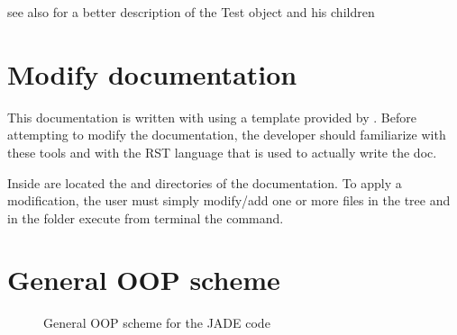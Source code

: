 \documentclass[letterpaper,10pt,english]{sphinxmanual}
\let\sphinxpxdimen\pdfpxdimen\else\newdimen\sphinxpxdimen
\begin{document}


see also {\hyperref[\detokenize{api/inputgeneration:testrunmodule}]{}} for a better description of the Test object and his children




\chapter{Modify documentation}
\label{\detokenize{dev/docmodify:modify-documentation}}\label{\detokenize{dev/docmodify::doc}}
This documentation is written with
 using a template
provided by . Before attempting
to modify the documentation, the developer should familiarize with these tools
and with the RST language that is used to actually write the doc.

Inside  are located the  and  directories
of the documentation. To apply a modification, the user must simply modify/add one
or more files in the  tree and in the  folder execute from terminal
the  command.


\chapter{General OOP scheme}
\label{\detokenize{api/general:general-oop-scheme}}\label{\detokenize{api/general::doc}}
\begin{figure}[htbp]
\centering
\capstart

\noindent\sphinxincludegraphics[width=600\sphinxpxdimen]{{OOPscheme}.png}
\caption{General OOP scheme for the JADE code}\label{\detokenize{api/general:id1}}\end{figure}
\end{document}
